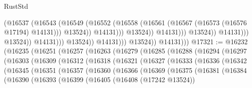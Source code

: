 \begin{lexlean}{RustStd}
\begin{coremodule}
                                                      (@16537
                                                        (@16543
                                                          (@16549
                                                            (@16552
                                                              (@16558
                                                                (@16561
                                                                  (@16567
                                                                    (@16573
                                                                      (@16576 @17194)
                                                                      @14131)))
                                                                @13524))
                                                            @14131)))
                                                      @13524))
                                                  @14131)))
                                            @13524))
                                        @14131)))
                                  @13524))
                              @14131)))
                        @13524))
                    @14131)))
              @13524))
          @14131)))
@17321 := @16232
    (@16235
      (@16251
        (@16257
          (@16263
            (@16279
              (@16285
                (@16288
                  (@16294
                    (@16297
                      (@16303
                        (@16309
                          (@16312
                            (@16318
                              (@16321
                                (@16327
                                  (@16333
                                    (@16336
                                      (@16342
                                        (@16345
                                          (@16351
                                            (@16357
                                              (@16360
                                                (@16366
                                                  (@16369
                                                    (@16375
                                                      (@16381
                                                        (@16384
                                                          (@16390
                                                            (@16393
                                                              (@16399
                                                                (@16405
                                                                  (@16408 (@17242 @13524))

\end{coremodule}
\end{lexlean}
